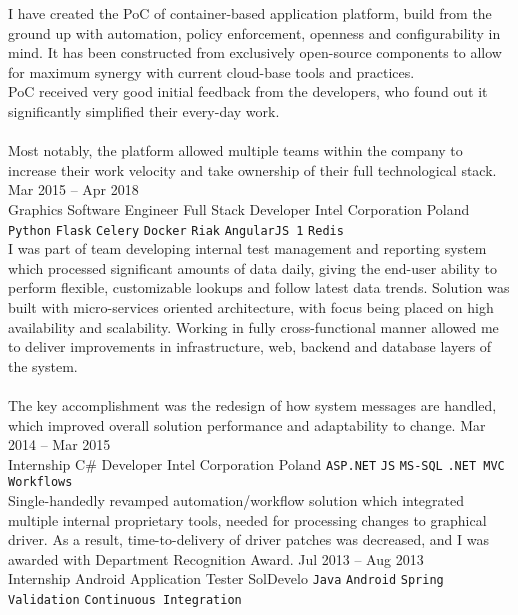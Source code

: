 \documentclass[9pt]{style/developercv}
\begin{document}
\begin{entrylist}
{			I have created the PoC of container-based application platform, build 
			from the ground up with automation, policy enforcement, 
			openness and configurability in mind. 
			It has been constructed from exclusively open-source components to
			allow for maximum synergy with current cloud-base 
			tools and practices. \\
			PoC received very good initial feedback from the developers, 
			who found out it significantly simplified their every-day work.\\ \\
			Most notably, the platform allowed multiple teams within the company
			to increase their work velocity and take ownership of their full technological
			stack.
		}
	\entry
		{Mar 2015 -- Apr 2018\\\footnotesize{Graphics Software Engineer}}
		{Full Stack Developer}
		{Intel Corporation Poland}
		{
			\texttt{Python}\slashsep
			\texttt{Flask}\slashsep
			\texttt{Celery}\slashsep
			\texttt{Docker}\slashsep
			\texttt{Riak}\slashsep
			\texttt{AngularJS 1}\slashsep
			\texttt{Redis}\\

			I was part of team developing internal test management and reporting 
			system which processed significant amounts of data daily, giving 
			the end-user ability to perform flexible, customizable lookups
			and follow latest data trends.
			Solution was built with micro-services oriented architecture, with 
			focus being placed on high availability and scalability.
			Working in fully cross-functional manner allowed me to deliver 
			improvements in infrastructure, web, backend and database layers 
			of the system.\\ \\
			The key accomplishment was the redesign of how system messages are 
			handled, which improved overall solution performance and adaptability to
			change.
		}
	\entry
		{Mar 2014 -- Mar 2015\\\footnotesize{Internship}}
		{C\# Developer}
		{Intel Corporation Poland}
		{
			\texttt{ASP.NET}\slashsep
			\texttt{JS}\slashsep
			\texttt{MS-SQL}\slashsep
			\texttt{.NET MVC}\slashsep
			\texttt{Workflows}\\

			Single-handedly revamped automation/workflow solution which integrated
			multiple internal proprietary tools, needed for processing changes to 
			graphical driver. As a result, time-to-delivery of driver patches was 
			decreased, and I was awarded with Department Recognition Award.
		}
	\entry
		{Jul 2013 -- Aug 2013\\\footnotesize{Internship}}
		{Android Application Tester}
		{SolDevelo}
		{
			\texttt{Java}\slashsep
			\texttt{Android}\slashsep
			\texttt{Spring}\slashsep
			\texttt{Validation}\slashsep
			\texttt{Continuous Integration}\\

}
\end{entrylist}
\end{document}
